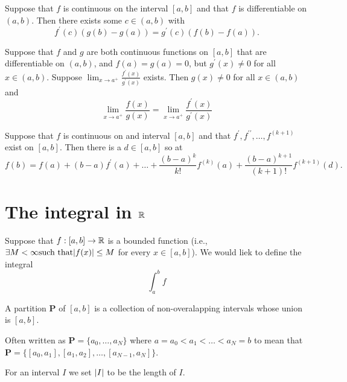 \documentclass[twoside]{article}
\begin{document}
\begin{theorem}
	Suppose that $f $ is continuous on the interval $[a, b ]$ and that $f $ is differentiable on $(a, b )$.
	Then there exists some $c \in (a, b )$ with
	\begin{equation*}
		f^{\prime}(c)(g(b) - g(a)) = g^{\prime}(c)(f(b) - f(a)).
	\end{equation*}
\end{theorem}

\begin{theorem}
	Suppose that $f$ and $g$ are both continuous functions on $[a,b]$ that are differentiable on $(a,b)$, and
	$f(a) = g(a) = 0$, but $g^{\prime}(x) \neq 0$ for all $x \in (a,b)$. Suppose
	$\lim_{x \to a^{+}} \frac{f^{\prime}(x)}{g^{\prime}(x)}$ exists. Then $g(x) \neq 0$ for all $x \in (a,b)$ and
	\begin{equation*}
		\lim_{x \to a^{+}} \frac{f(x)}{g(x)} = \lim_{x \to a^{+}} \frac{f^{\prime}(x)}{g^{\prime}(x)}
	\end{equation*}
\end{theorem}

\begin{theorem}
	Suppose that $f$ is continuous on and interval $[a,b]$ and that $f^{\prime}, f^{\prime\prime}, \dots, f^{(k+1)}$
	exist on $[a,b]$. Then there is a $d \in [a,b]$ so at
	\begin{equation*}
		f(b) = f(a) + (b - a)f^{\prime}(a) + \dots + \frac{(b - a)^{k}}{k!}f^{(k)}(a) + \frac{(b-a)^{k+1}}{(k+1)!}f^{(k+1)}(d).
	\end{equation*}
\end{theorem}

\newpage
\section{The integral in $\mathbb{R}$}

\begin{definition}
	Suppose that $f : [a,b] \to \mathbb{R}$ is a bounded function (i.e., $\exists M < \infty \text{such that} \abs{f(x)} \leq M$
	for every $x \in [a, b]$). We would liek to define the integral
	\begin{equation*}
		\int_{a}^{b} f
	\end{equation*}
\end{definition}

\begin{definition}[ Partitions ]
	A partition $\bm{P}$ of $[a,b]$ is a collection of non-overalapping intervals whose union is $[a,b]$.

	Often written as $\bm{P} = \{a_{0}, \dots, a_{N}\}$ where $a = a_{0} < a_{1} < \dots < a_{N} = b$ to mean that\\
	$\bm{P} = \{[a_{0}, a_{1}], [a_{1}, a_{2}], \dots, [a_{N-1}, a_{N}]\}$.

	For an interval $I$ we set $\abs{I}$ to be the length of $I$.
\end{definition}
\end{document}
